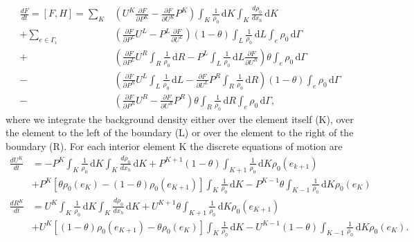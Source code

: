 \documentclass{article}
\begin{document}
\begin{equation}
	\begin{aligned}
		\frac{d F}{d t} = [F, H] = \sum_K & \left(U^K \frac{\partial F}{\partial P^K} - \frac{\partial F}{\partial U^K} P^K\right) \int_K \! \frac{1}{\rho_0} \, \mathrm{d}K   \int_K \! \frac{d \rho_0}{d x_h} \, \mathrm{d}K \\
		+ \sum_{e\in\Gamma_i} & \left( \frac{\partial F}{\partial P^L} U^L - P^L \frac{\partial F}{\partial U^L} \right) (1-\theta) \int_L \! \frac{1}{\rho_0} \, \mathrm{d}L \int_e \! \rho_0 \, \mathrm{d}\Gamma  \\
		+ & \left( \frac{\partial F}{\partial P^L} U^R \int_R \! \frac{1}{\rho_0} \, \mathrm{d}R - P^L \int_L \! \frac{1}{\rho_0} \, \mathrm{d}L \frac{\partial F}{\partial U^R} \right) \theta \int_e \! \rho_0 \, \mathrm{d}\Gamma \\
- & \left( \frac{\partial F}{\partial P^R} U^L \int_L \! \frac{1}{\rho_0} \, \mathrm{d}L - \frac{\partial F}{\partial U^L} P^R \int_R \! \frac{1}{\rho_0} \, \mathrm{d}R \right) (1-\theta) \int_e \! \rho_0 \, \mathrm{d}\Gamma\\
	- & \left( \frac{\partial F}{\partial P^R} U^R - \frac{\partial F}{\partial U^R} P^R\right) \theta \int_R \! \frac{1}{\rho_0} \, \mathrm{d}R \int_e \! \rho_0 \, \mathrm{d}\Gamma,	
	\end{aligned}
\end{equation}
	where we integrate the background density either over the element itself (K), over the element to the left of the boundary (L) or over the element to the right of the boundary (R). For each interior element K the discrete equations of motion are
\begin{equation}
	\begin{aligned}
		\frac{d U^K}{d t} &= -P^K  \int_K \! \frac{1}{\rho_0} \, \mathrm{d}K   \int_K \! \frac{d \rho_0}{d x_h} \, \mathrm{d}K + P^{K+1} (1-\theta) \int_{K+1} \! \frac{1}{\rho_0} \, \mathrm{d}K \rho_0(e_{k+1}) \\
		&+ P^K [\theta \rho_0(e_K) - (1-\theta) \rho_0(e_{K+1})] \int_K \! \frac{1}{\rho_0} \, \mathrm{d}K - P^{K-1} \theta \int_{K-1} \! \frac{1}{\rho_0} \, \mathrm{d}K \rho_0(e_K) \\
		\frac{d R^K}{d t} &= U^K \int_K \! \frac{1}{\rho_0} \, \mathrm{d}K   \int_K \! \frac{d \rho_0}{d x_h} \, \mathrm{d}K + U^{K+1} \theta \int_{K+1} \! \frac{1}{\rho_0} \, \mathrm{d}K \rho_0(e_{K+1}) \\
		&+ U^K [(1-\theta) \rho_0(e_{K+1}) - \theta \rho_0(e_K)] \int_K \! \frac{1}{\rho_0} \, \mathrm{d}K - U^{K-1} (1-\theta) \int_{K-1} \! \frac{1}{\rho_0} \, \mathrm{d}K \rho_0(e_K) .
	\end{aligned}
\end{equation}
\end{document}
